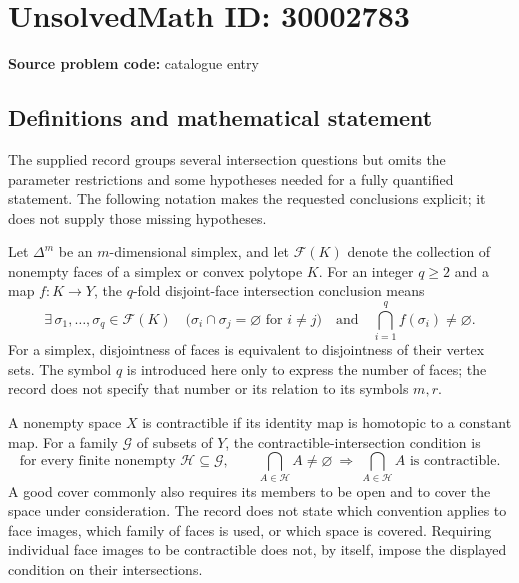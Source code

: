 \documentclass[11pt]{article}
\begin{document}
\section*{UnsolvedMath ID: 30002783}
\textbf{Source problem code:} catalogue entry
\subsection{Definitions and mathematical statement}
The supplied record groups several intersection questions but omits the parameter restrictions and some hypotheses needed for a fully quantified statement. The following notation makes the requested conclusions explicit; it does not supply those missing hypotheses.

Let \(\Delta^m\) be an \(m\)-dimensional simplex, and let \(\mathcal F(K)\) denote the collection of nonempty faces of a simplex or convex polytope \(K\). For an integer \(q\ge 2\) and a map \(f:K\to Y\), the \(q\)-fold disjoint-face intersection conclusion means
\[
\exists\,\sigma_1,\ldots,\sigma_q\in\mathcal F(K)\quad
\bigl(\sigma_i\cap\sigma_j=\varnothing\text{ for }i\ne j\bigr)
\quad\text{and}\quad
\bigcap_{i=1}^{q} f(\sigma_i)\ne\varnothing.
\]
For a simplex, disjointness of faces is equivalent to disjointness of their vertex sets. The symbol \(q\) is introduced here only to express the number of faces; the record does not specify that number or its relation to its symbols \(m,r\).

A nonempty space \(X\) is contractible if its identity map is homotopic to a constant map. For a family \(\mathcal G\) of subsets of \(Y\), the contractible-intersection condition is
\[
\text{for every finite nonempty }\mathcal H\subseteq\mathcal G,
\qquad
\bigcap_{A\in\mathcal H} A\ne\varnothing
\ \Longrightarrow\ 
\bigcap_{A\in\mathcal H} A\text{ is contractible}.
\]
A good cover commonly also requires its members to be open and to cover the space under consideration. The record does not state which convention applies to face images, which family of faces is used, or which space is covered. Requiring individual face images to be contractible does not, by itself, impose the displayed condition on their intersections.
\end{document}
